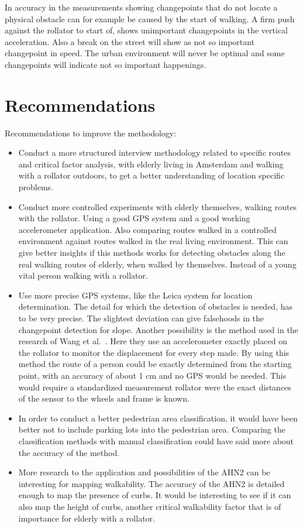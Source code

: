 In accuracy in the measurements showing changepoints that do not locate a physical obstacle can for example be caused by the start of walking. A firm push against the rollator to start of, shows unimportant changepoints in the vertical acceleration. Also a break on the street will show as not so important changepoint in speed. The urban environment will never be optimal and some changepoints will indicate not so important happenings. 

\section{Recommendations} %
Recommendations to improve the methodology:
\begin{itemize}
\item Conduct a more structured interview methodology related to specific routes and critical factor analysis, with elderly living in Amsterdam and walking with a rollator outdoors, to get a better understanding of location specific problems. 

\item Conduct more controlled experiments with elderly themselves, walking routes with the rollator. Using a good GPS system and a good working accelerometer application. Also comparing routes walked in a controlled environment against routes walked in the real living environment. This can give better insights if this methods works for detecting obstacles along the real walking routes of elderly, when walked by themselves. Instead of a young vital person walking with a rollator. 

\item Use more precise GPS systems, like the Leica system for location determination. The detail for which the detection of obstacles is needed, has to be very precise. The slightest deviation can give falsehoods in the changepoint detection for slope. Another possibility is the method used in the research of Wang et al.~\cite{Wang2015}. Here they use an accelerometer exactly placed on the rollator to monitor the displacement for every step made. By using this method the route of a person could be exactly determined from the starting point, with an accuracy of about 1 cm and no GPS would be needed. This would require a standardized measurement rollator were the exact distances of the sensor to the wheels and frame is known.

\item In order to conduct a better pedestrian area classification, it would have been better not to include parking lots into the pedestrian area. Comparing the classification methods with manual classification could have said more about the accuracy of the method. 

\item More research to the application and possibilities of the AHN2 can be interesting for mapping walkability. The accuracy of the AHN2 is detailed enough to map the presence of curbs. It would be interesting to see if it can also map the height of curbs, another critical walkability factor that is of importance for elderly with a rollator.

\end{itemize}

